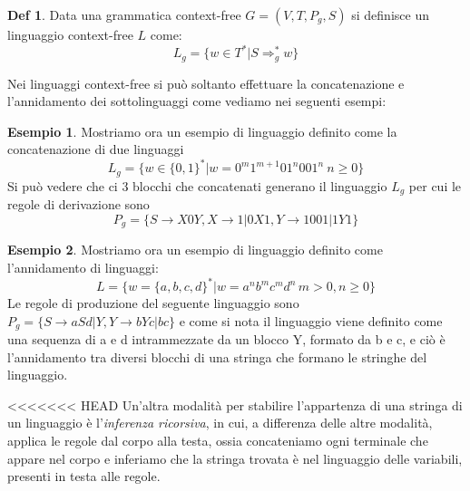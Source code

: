 \documentclass[a4paper]{book}
\theoremstyle{definition}%
\newtheorem*{defi}{Def}%
\newtheorem*{esempio}{Esempio}
\begin{document}
  \begin{defi}
    Data una grammatica context-free $G = (V, T, P_g, S)$ si definisce un linguaggio context-free $L$ come:
    \begin{equation*}
      L_g = \{ w \in T^* | S \Rightarrow _g ^* w \}
    \end{equation*}
  \end{defi}

  Nei linguaggi context-free si può soltanto effettuare la concatenazione e l'annidamento dei sottolinguaggi come vediamo
  nei seguenti esempi:
  
  \begin{esempio}
  Mostriamo ora un esempio di linguaggio definito come la concatenazione di due linguaggi
  \begin{equation*}
     L_g = \{ w \in \{0,1\}^* | w = 0^m 1^{m+1}01^n001^n \ n\geq 0\}
  \end{equation*}
  Si può vedere che ci 3 blocchi che concatenati generano il linguaggio $L_g$ per cui le regole di derivazione sono
  \[ P_g = \{S \to X0Y, X \to 1 | 0X1, Y \to 1001 | 1Y1\} \]
  \end{esempio}

  \begin{esempio}
    Mostriamo ora un esempio di linguaggio definito come l'annidamento di linguaggi:
    \begin{equation*}
      L = \{ w = \{a,b,c,d\}^* | w = a^nb^mc^md^n \, m > 0, n \geq 0\}
    \end{equation*}
    Le regole di produzione del seguente linguaggio sono $P_g = \{S \to aSd | Y, Y \to bYc | bc\}$
    e come si nota il linguaggio viene definito come una sequenza di a e d intrammezzate da un blocco Y, formato da b e c,
    e ciò è l'annidamento tra diversi blocchi di una stringa che formano le stringhe del linguaggio.
  \end{esempio}

<<<<<<< HEAD
  Un'altra modalità per stabilire l'appartenza di una stringa di un linguaggio è l'\emph{inferenza ricorsiva}, in cui, a differenza delle altre
  modalità, applica le regole dal corpo alla testa, ossia concateniamo ogni terminale che appare nel corpo e inferiamo che la stringa trovata è nel linguaggio delle variabili, presenti in testa alle regole.
\end{document}
